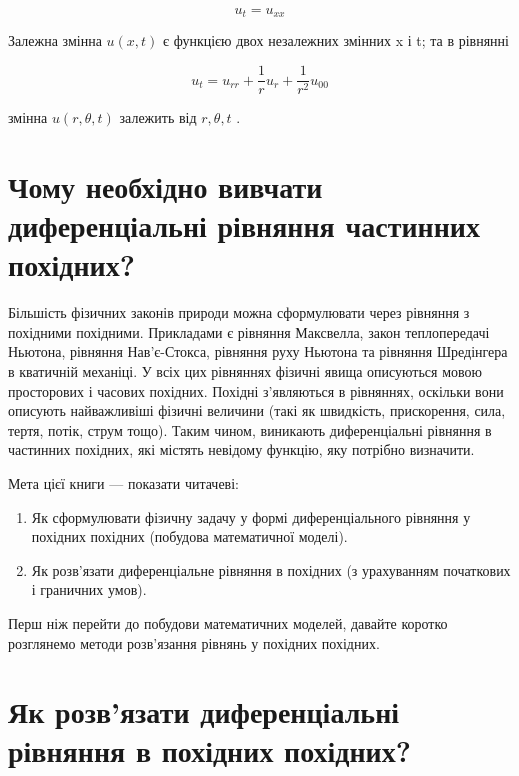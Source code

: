 \documentclass[
  ukrainian,
]{article}
\begin{document}
\[
u_t = u_{xx}
\]

Залежна змінна \(u(x, t)\) є функцією двох незалежних змінних x і t; та
в рівнянні

\[
u_t = u_{rr} + \frac{1}{r} u_r + \frac{1}{r^2} u_{00}
\]

змінна \(u(r, \theta, t)\) залежить від \(r, \theta, t\) .

\section{Чому необхідно вивчати диференціальні рівняння частинних
похідних?}\label{ux447ux43eux43cux443-ux43dux435ux43eux431ux445ux456ux434ux43dux43e-ux432ux438ux432ux447ux430ux442ux438-ux434ux438ux444ux435ux440ux435ux43dux446ux456ux430ux43bux44cux43dux456-ux440ux456ux432ux43dux44fux43dux43dux44f-ux447ux430ux441ux442ux438ux43dux43dux438ux445-ux43fux43eux445ux456ux434ux43dux438ux445}

Більшість фізичних законів природи можна сформулювати через рівняння з
похідними похідними. Прикладами є рівняння Максвелла, закон
теплопередачі Ньютона, рівняння Нав'є-Стокса, рівняння руху Ньютона та
рівняння Шредінгера в кватичній механіці. У всіх цих рівняннях фізичні
явища описуються мовою просторових і часових похідних. Похідні
з'являються в рівняннях, оскільки вони описують найважливіші фізичні
величини (такі як швидкість, прискорення, сила, тертя, потік, струм
тощо). Таким чином, виникають диференціальні рівняння в частинних
похідних, які містять невідому функцію, яку потрібно визначити.

Мета цієї книги --- показати читачеві:

\begin{enumerate}
\def\labelenumi{\arabic{enumi}.}
\item
  Як сформулювати фізичну задачу у формі диференціального рівняння у
  похідних похідних (побудова математичної моделі).
\item
  Як розв'язати диференціальне рівняння в похідних (з урахуванням
  початкових і граничних умов).
\end{enumerate}

Перш ніж перейти до побудови математичних моделей, давайте коротко
розглянемо методи розв'язання рівнянь у похідних похідних.

\section{Як розв'язати диференціальні рівняння в похідних
похідних?}\label{ux44fux43a-ux440ux43eux437ux432ux44fux437ux430ux442ux438-ux434ux438ux444ux435ux440ux435ux43dux446ux456ux430ux43bux44cux43dux456-ux440ux456ux432ux43dux44fux43dux43dux44f-ux432-ux43fux43eux445ux456ux434ux43dux438ux445-ux43fux43eux445ux456ux434ux43dux438ux445}
\end{document}
